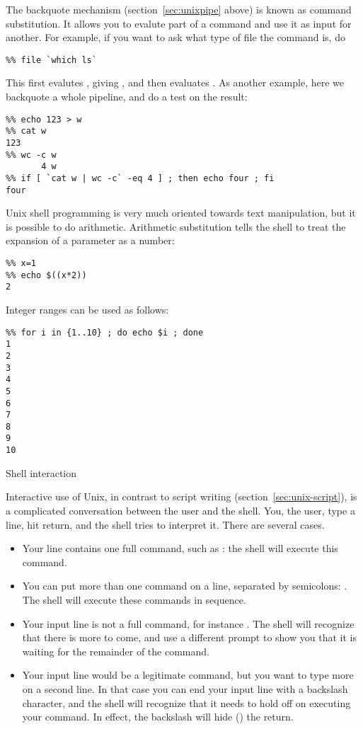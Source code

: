 The backquote mechanism (section~\ref{sec:unixpipe} above)
is known as command substitution. It allows you to evalute part
of a command and use it as input for another. For example,
if you want to ask what type of file the command  is, do
\begin{verbatim}
%% file `which ls`
\end{verbatim}
This first evalutes , giving , and then
evaluates . As another example, here
we backquote a whole pipeline, and do a test on the result:
\begin{verbatim}
%% echo 123 > w
%% cat w
123
%% wc -c w
       4 w
%% if [ `cat w | wc -c` -eq 4 ] ; then echo four ; fi
four
\end{verbatim}

Unix shell programming is very much oriented towards text manipulation, but it 
is possible to do arithmetic. 
Arithmetic substitution tells the shell to treat the expansion of a
parameter as a number:
\begin{verbatim}
%% x=1
%% echo $((x*2))
2
\end{verbatim}

Integer ranges can be used as follows:
\begin{verbatim}
%% for i in {1..10} ; do echo $i ; done
1
2
3
4
5
6
7
8
9
10
\end{verbatim}

 {Shell interaction}

Interactive use of Unix, in contrast to script writing
(section~\ref{sec:unix-script}), is a complicated conversation between
the user and the shell. You, the user, type a line, hit return, and
the shell tries to interpret it. There are several cases.
\begin{itemize}
\item Your line contains one full command, such as : the
  shell will execute this command.
\item You can put more than one command on a line, separated by
  semicolons: . The shell will execute these
  commands in sequence.
\item Your input line is not a full command, for instance . The shell will recognize that there is more to come, and use
  a different prompt to show you that it is waiting for the remainder
  of the command.
\item Your input line would be a legitimate command, but you want to
  type more on a second line. In that case you can end your input line
  with a backslash character, and the shell will recognize that it
  needs to hold off on executing your command. In effect, the
  backslash will hide () the return.
\end{itemize}

